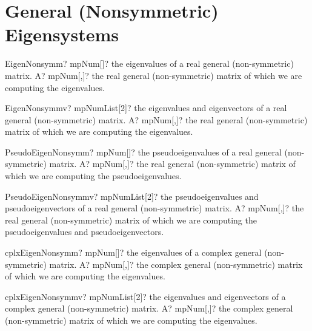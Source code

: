 \documentclass[12pt,a4paper,openany]{book}
\begin{document}
\section{General (Nonsymmetric) Eigensystems}

\begin{mpFunctionsExtract}
\mpFunctionOne
{EigenNonsymm? mpNum[]? the eigenvalues of a real general (non-symmetric) matrix.}
{A? mpNum[,]? the real general (non-symmetric) matrix of which we are computing the eigenvalues.}
\end{mpFunctionsExtract}

\begin{mpFunctionsExtract}
\mpFunctionOne
{EigenNonsymmv? mpNumList[2]? the eigenvalues and eigenvectors of a real general (non-symmetric) matrix.}
{A? mpNum[,]? the real general (non-symmetric) matrix of which we are computing the eigenvalues.}
\end{mpFunctionsExtract}

\begin{mpFunctionsExtract}
\mpFunctionOne
{PseudoEigenNonsymm? mpNum[]? the pseudoeigenvalues of a real general (non-symmetric) matrix.}
{A? mpNum[,]? the real general (non-symmetric) matrix of which we are computing the pseudoeigenvalues.}
\end{mpFunctionsExtract}

\begin{mpFunctionsExtract}
\mpFunctionOne
{PseudoEigenNonsymmv? mpNumList[2]? the pseudoeigenvalues and pseudoeigenvectors of a real general (non-symmetric) matrix.}
{A? mpNum[,]? the real general (non-symmetric) matrix of which we are computing the pseudoeigenvalues and pseudoeigenvectors.}
\end{mpFunctionsExtract}

\begin{mpFunctionsExtract}
\mpFunctionOne
{cplxEigenNonsymm? mpNum[]? the eigenvalues of a complex general (non-symmetric) matrix.}
{A? mpNum[,]? the complex general (non-symmetric) matrix of which we are computing the eigenvalues.}
\end{mpFunctionsExtract}

\begin{mpFunctionsExtract}
\mpFunctionOne
{cplxEigenNonsymmv? mpNumList[2]? the eigenvalues and eigenvectors of a complex general (non-symmetric) matrix.}
{A? mpNum[,]? the complex general (non-symmetric) matrix of which we are computing the eigenvalues.}
\end{mpFunctionsExtract}
\end{document}

